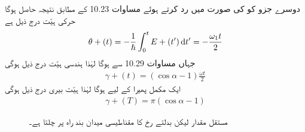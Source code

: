دوسرے جزو کو  کی صورت میں رد کرتے ہوئے مساوات 10.23 کے مطابق نتیجہ حاصل ہوگا حرکی ہیّت درج ذیل ہے 
\begin{align}
\theta + (t) = - \frac{1}{\hslash} \int_0^t E + (t') \dif t' = - \frac{\omega_1 t}{2}
\end{align}
جہاں مساوات 10.29 سے  ہوگا لہٰذا ہندسی ہیّت درج ذیل ہوگی 
\begin{align}
\gamma + (t) = (\cos \alpha - 1) \frac{\omega t}{2}
\end{align}
ایک مکمل پھیرا کے لیے  ہوگا لہٰذا ہیّت بیری درج ذیل ہوگی 
\begin{align}
\gamma + (T) = \pi (\cos \alpha - 1)
\end{align}

\begin{figure}
\centering
{}
\caption{مستقل  مقدار لیکن بدلتے رخ کا مقناطیسی میدان بند راہ پر چلتا ہے۔}
\label{شکل_حرارت_نا_گزر_مقناطیسی_میدان_بند_راہ}
\end{figure}

